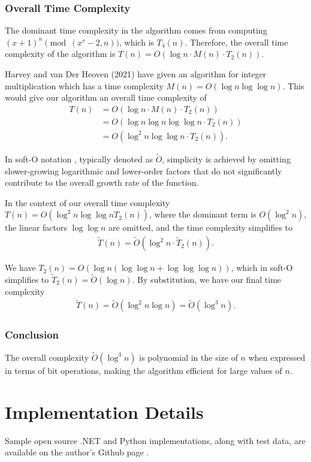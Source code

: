 \documentclass{article}
\theoremstyle{plain}
\theoremstyle{definition}
\begin{document}
\subsubsection{Overall Time Complexity}
The dominant time complexity in the algorithm comes from computing $(x+1)^n \pmod{(x^r-2,n)}$, which is $T_4(n)$. Therefore, the overall time complexity of the algorithm is $T(n) = O(\log n \cdot M(n) \cdot T_2(n))$.

Harvey and van Der Heoven (2021) \cite{harveyvanderhoeven2021} have given an algorithm for integer multiplication which has a time complexity $M(n) = O(\log n \log\log n)$. This would give our algorithm an overall time complexity of
\begin{align*}
    T(n) &= O(\log n \cdot  M(n) \cdot  T_2(n))
    \\ &= O(\log n \log n \log\log n \cdot  T_2(n))
    \\ &= O(\log^2 n \log\log n \cdot  T_2(n)) .
\end{align*}

In soft-O notation \cite{gathengerhard2013softo}, typically denoted as $\tilde{O}$, simplicity is achieved by omitting slower-growing logarithmic and lower-order factors that do not significantly contribute to the overall growth rate of the function.

In the context of our overall time complexity $T(n) = O(\log^2 n \log\log n T_2(n))$, where the dominant term is $O(\log^2 n)$, the linear factors $\log\log n$ are omitted, and the time complexity simplifies to
\begin{align*}
    \tilde{T}(n) = \tilde{O}(\log^2 n \cdot \tilde{T}_2(n)) .
\end{align*}

We have $T_2(n) = O(\log n (\log \log n + \log \log \log n))$, which in soft-O simplifies to $\tilde{T}_2(n) = \tilde{O}(\log n)$. By substitution, we have our final time complexity
\begin{align*}
    \tilde{T}(n) = \tilde{O}(\log^2 n \log n) = \tilde{O}(\log^3 n) .
\end{align*}

\subsubsection{Conclusion}
The overall complexity $\tilde{O}(\log^3 n)$ is polynomial in the size of $n$ when expressed in terms of bit operations, making the algorithm efficient for large values of $n$.

\section{Implementation Details}
Sample open source .NET and Python implementations, along with test data, are available on the author's Github page \cite{githubrepo}.

\begingroup
\raggedright


\endgroup
\end{document}
